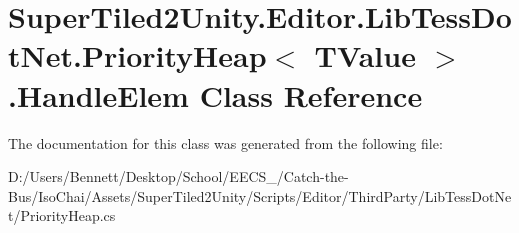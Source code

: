 \hypertarget{class_super_tiled2_unity_1_1_editor_1_1_lib_tess_dot_net_1_1_priority_heap_1_1_handle_elem}{}\section{Super\+Tiled2\+Unity.\+Editor.\+Lib\+Tess\+Dot\+Net.\+Priority\+Heap$<$ T\+Value $>$.Handle\+Elem Class Reference}
\label{class_super_tiled2_unity_1_1_editor_1_1_lib_tess_dot_net_1_1_priority_heap_1_1_handle_elem}


The documentation for this class was generated from the following file\+:\begin{DoxyCompactItemize}
\item 
D\+:/\+Users/\+Bennett/\+Desktop/\+School/\+E\+E\+C\+S\+\_/\+Catch-\/the-\/\+Bus/\+Iso\+Chai/\+Assets/\+Super\+Tiled2\+Unity/\+Scripts/\+Editor/\+Third\+Party/\+Lib\+Tess\+Dot\+Net/Priority\+Heap.\+cs\end{DoxyCompactItemize}

